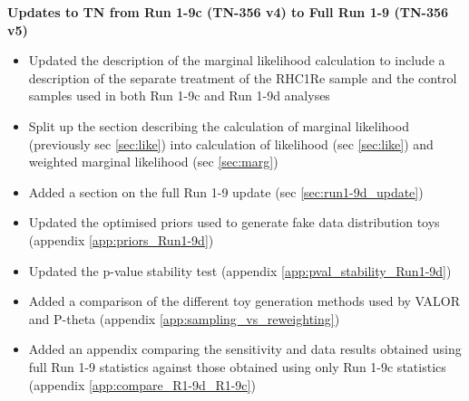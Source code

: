 \documentclass[11pt]{elsarticle}
\begin{document}





\newpage

{\color{red}
\textbf{Updates to TN from Run 1-9c (TN-356 v4) to Full Run 1-9 (TN-356 v5)}
\begin{itemize}
	\item Updated the description of the marginal likelihood calculation to include a description of the separate treatment of the RHC1Re sample and the control samples used in both Run 1-9c and Run 1-9d analyses
	\item Split up the section describing the calculation of marginal likelihood (previously sec \ref{sec:like}) into calculation of likelihood (sec \ref{sec:like}) and weighted marginal likelihood (sec \ref{sec:marg})
	\item Added a section on the full Run 1-9 update (sec \ref{sec:run1-9d_update})
	\item Updated the optimised priors used to generate fake data distribution toys (appendix \ref{app:priors_Run1-9d})
	\item Updated the p-value stability test (appendix \ref{app:pval_stability_Run1-9d})
	\item Added a comparison of the different toy generation methods used by VALOR and P-theta (appendix \ref{app:sampling_vs_reweighting})
	\item Added an appendix comparing the sensitivity and data results obtained using full Run 1-9 statistics against those obtained using only Run 1-9c statistics (appendix \ref{app:compare_R1-9d_R1-9c})
\end{itemize}
} %

\newpage

\tableofcontents

\newpage










\clearpage
\begin{appendices}
	
	
	
	
	
\end{appendices}

\clearpage
\end{document}
